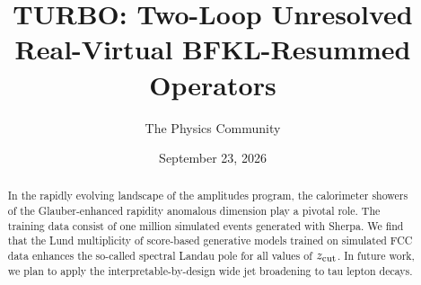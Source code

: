 \documentclass[11pt]{article}
\title{TURBO: Two-Loop Unresolved Real-Virtual BFKL-Resummed Operators}
\author{The Physics Community}
\date{September 23, 2026}
\begin{document}
\maketitle
\begin{abstract}
In the rapidly evolving landscape of the amplitudes program, the
calorimeter showers of the Glauber-enhanced rapidity anomalous dimension
play a pivotal role. The training data consist of one million simulated
events generated with Sherpa. We find that the Lund multiplicity of
score-based generative models trained on simulated FCC data enhances the
so-called spectral Landau pole for all values of $z_{\rm cut}$. In
future work, we plan to apply the interpretable-by-design wide jet
broadening to tau lepton decays.
\end{abstract}
\tableofcontents



\nocite{*}


\end{document}
